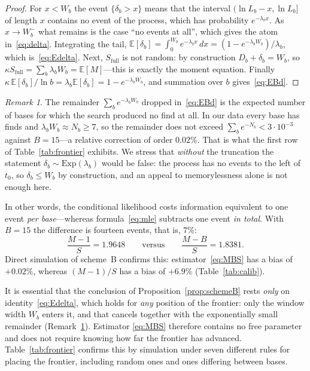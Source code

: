 \documentclass[11pt,a4paper]{article}
\theoremstyle{plain}
\theoremstyle{remark}
\newtheorem{remark}{Remark}
\begin{document}
\begin{proof}
For $x<W_b$ the event $\{\delta_b>x\}$ means that the interval
$(\ln L_b-x,\ln L_b]$ of length $x$ contains no event of the process, which has
probability $e^{-\lambda_b x}$. As $x\to W_b^-$ what remains is the case ``no
events at all'', which gives the atom in~\eqref{eq:delta}. Integrating the tail,
$\mathbb E[\delta_b]=\int_0^{W_b}e^{-\lambda_b x}\,dx=(1-e^{-\lambda_b W_b})/\lambda_b$,
which is~\eqref{eq:Edelta}. Next, $S_{\mathrm{full}}$ is not random: by
construction $D_b+\delta_b=W_b$, so
$\kappa S_{\mathrm{full}}=\sum_b\lambda_b W_b=\mathbb E[M]$---this is exactly the
moment equation. Finally
$\kappa\,\mathbb E[\delta_b]/\ln b=\lambda_b\mathbb E[\delta_b]=1-e^{-\lambda_b W_b}$,
and summation over $b$ gives~\eqref{eq:EBd}.
\end{proof}

\begin{remark}\label{rem:atom}
The remainder $\sum_b e^{-\lambda_b W_b}$ dropped in~\eqref{eq:EBd} is the
expected number of bases for which the search produced no find at all. In our
data every base has finds and $\lambda_b W_b\approx N_b\ge7$, so the remainder
does not exceed $\sum_b e^{-N_b}<3\cdot10^{-3}$ against $B=15$---a relative
correction of order $0.02\%$. That is what the first row of
Table~\ref{tab:frontier} exhibits. We stress that \emph{without} the truncation
the statement $\delta_b\sim\mathrm{Exp}(\lambda_b)$ would be false: the process
has no events to the left of $t_0$, so $\delta_b\le W_b$ by construction, and an
appeal to memorylessness alone is not enough here.
\end{remark}

In other words, the conditional likelihood costs information equivalent to one
event \emph{per base}---whereas formula~\eqref{eq:mle} subtracts one event
\emph{in total}. With $B=15$ the difference is fourteen events, that is, $7\%$:
\begin{equation}
\frac{M-1}{S}=1.9648\qquad\text{versus}\qquad\frac{M-B}{S}=1.8381 .
\end{equation}
Direct simulation of scheme~B confirms this: estimator~\eqref{eq:MBS} has a bias
of $+0.02\%$, whereas $(M-1)/S$ has a bias of $+6.9\%$
(Table~\ref{tab:calib}).

It is essential that the conclusion of Proposition~\ref{prop:schemeB} rests
\emph{only} on identity~\eqref{eq:Edelta}, which holds for \emph{any} position of
the frontier: only the window width $W_b$ enters it, and that cancels together
with the exponentially small remainder (Remark~\ref{rem:atom}). Estimator
\eqref{eq:MBS} therefore contains no free parameter and does not require knowing
how far the frontier has advanced. Table~\ref{tab:frontier} confirms this by
simulation under seven different rules for placing the frontier, including
random ones and ones differing between bases.
\end{document}
